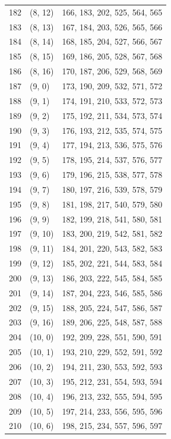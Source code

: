 \documentclass{article}
\begin{document}
\begin{longtable}{lll}
  182 & (8, 12) & 166, 183, 202, 525, 564, 565 \\
  183 & (8, 13) & 167, 184, 203, 526, 565, 566 \\
  184 & (8, 14) & 168, 185, 204, 527, 566, 567 \\
  185 & (8, 15) & 169, 186, 205, 528, 567, 568 \\
  186 & (8, 16) & 170, 187, 206, 529, 568, 569 \\
  187 & (9, 0) & 173, 190, 209, 532, 571, 572 \\
  188 & (9, 1) & 174, 191, 210, 533, 572, 573 \\
  189 & (9, 2) & 175, 192, 211, 534, 573, 574 \\
  190 & (9, 3) & 176, 193, 212, 535, 574, 575 \\
  191 & (9, 4) & 177, 194, 213, 536, 575, 576 \\
  192 & (9, 5) & 178, 195, 214, 537, 576, 577 \\
  193 & (9, 6) & 179, 196, 215, 538, 577, 578 \\
  194 & (9, 7) & 180, 197, 216, 539, 578, 579 \\
  195 & (9, 8) & 181, 198, 217, 540, 579, 580 \\
  196 & (9, 9) & 182, 199, 218, 541, 580, 581 \\
  197 & (9, 10) & 183, 200, 219, 542, 581, 582 \\
  198 & (9, 11) & 184, 201, 220, 543, 582, 583 \\
  199 & (9, 12) & 185, 202, 221, 544, 583, 584 \\
  200 & (9, 13) & 186, 203, 222, 545, 584, 585 \\
  201 & (9, 14) & 187, 204, 223, 546, 585, 586 \\
  202 & (9, 15) & 188, 205, 224, 547, 586, 587 \\
  203 & (9, 16) & 189, 206, 225, 548, 587, 588 \\
  204 & (10, 0) & 192, 209, 228, 551, 590, 591 \\
  205 & (10, 1) & 193, 210, 229, 552, 591, 592 \\
  206 & (10, 2) & 194, 211, 230, 553, 592, 593 \\
  207 & (10, 3) & 195, 212, 231, 554, 593, 594 \\
  208 & (10, 4) & 196, 213, 232, 555, 594, 595 \\
  209 & (10, 5) & 197, 214, 233, 556, 595, 596 \\
  210 & (10, 6) & 198, 215, 234, 557, 596, 597 \\

\end{longtable}
\end{document}
